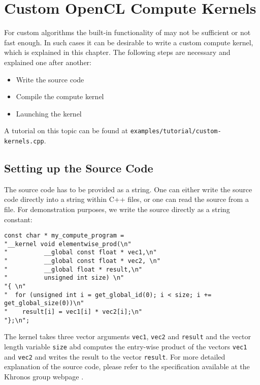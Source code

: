 

\chapter{Custom OpenCL Compute Kernels} \label{chap:custom}

For custom algorithms the built-in functionality of {\ViennaCL} may not be sufficient or not fast enough. In such cases it can be desirable to write a custom {\OpenCL} compute kernel, which is explained in this chapter. The following steps are necessary and explained one after another:
\begin{itemize}
 \item Write the {\OpenCL} source code
 \item Compile the compute kernel
 \item Launching the kernel
\end{itemize}
A tutorial on this topic can be found at \texttt{examples/tutorial/custom-kernels.cpp}.

\section{Setting up the {\OpenCL} Source Code}
The {\OpenCL} source code has to be provided as a string. One can either write the source code directly into a string within C++ files, or one can read the {\OpenCL} source from a file. For demonstration purposes, we write the source directly as a string constant:
\begin{lstlisting}
const char * my_compute_program = 
"__kernel void elementwise_prod(\n"
"          __global const float * vec1,\n"
"          __global const float * vec2, \n"
"          __global float * result,\n"
"          unsigned int size) \n"
"{ \n"
"  for (unsigned int i = get_global_id(0); i < size; i += get_global_size(0))\n"
"    result[i] = vec1[i] * vec2[i];\n"
"};\n";
\end{lstlisting}
The kernel takes three vector arguments \lstinline{vec1}, \lstinline{vec2} and \lstinline{result} and the vector length variable \lstinline{size} abd computes the entry-wise product of the vectors \lstinline|vec1| and \lstinline|vec2| and writes the result to the vector \lstinline|result|. For more detailed explanation of the {\OpenCL} source code, please refer to the specification available at the Khronos group webpage \cite{khronoscl}.

